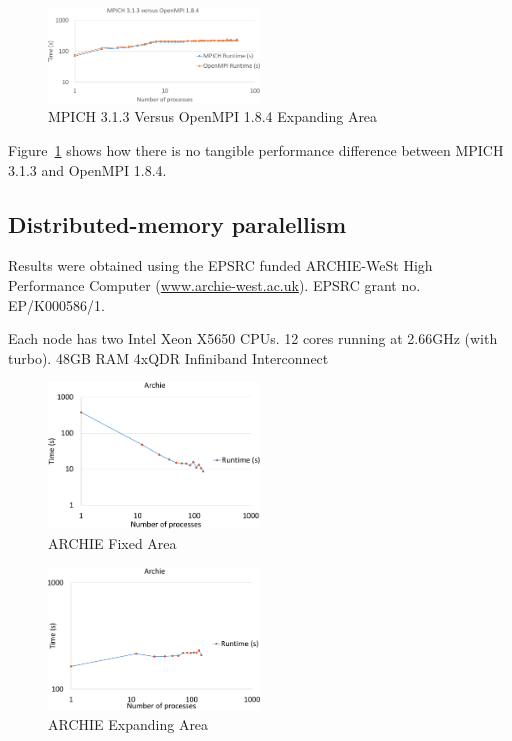 \begin{figure}
    \includegraphics[page=1,width=0.5\textwidth]
    {graphs/MPICH313-versus-OpenMPI184-crop.pdf}
    \caption{MPICH 3.1.3 Versus OpenMPI 1.8.4 Expanding Area}
    \label{fig:mpichversusopenmpiexpandingarea}
\end{figure}

Figure~\ref{fig:mpichversusopenmpiexpandingarea} shows how there is no tangible
performance difference between MPICH 3.1.3 and OpenMPI 1.8.4.

\subsection{Distributed-memory paralellism}

Results were obtained using the EPSRC funded ARCHIE-WeSt High Performance
Computer (\url{www.archie-west.ac.uk}). EPSRC grant no. EP/K000586/1.

Each node has two Intel Xeon X5650 CPUs. 12 cores running at 2.66GHz (with
turbo). 48GB RAM 4xQDR Infiniband Interconnect

\begin{figure}
    \includegraphics[page=1,width=0.5\textwidth]
    {graphs/ARCHIE-OpenMPI162-GFORTRAN482-default-mapping-fixed-area-crop.pdf}
    \caption{ARCHIE Fixed Area}
    \label{fig:archiefixedarea}
\end{figure}

\begin{figure}
    \includegraphics[page=1,width=0.5\textwidth]
    {graphs/ARCHIE-OpenMPI162-GFORTRAN482-default-mapping-expanding-area-crop.pdf}
    \caption{ARCHIE Expanding Area}
    \label{fig:archieexpandingarea}
\end{figure}

